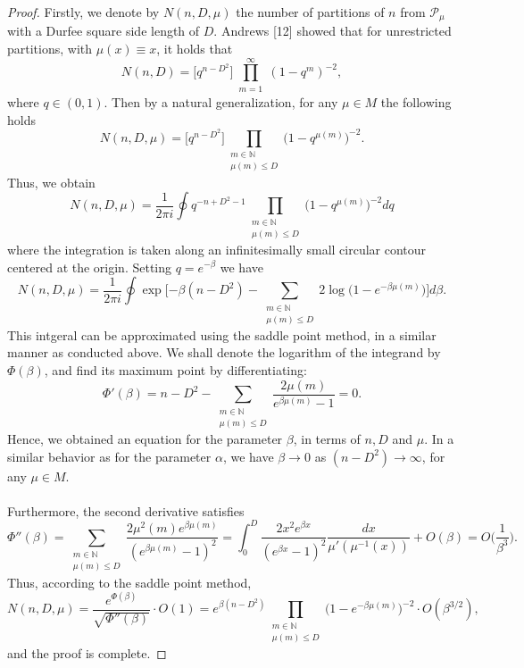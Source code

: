 \documentclass[10pt,a4paper]{amsart}
\begin{document}
\begin{proof}
    Firstly, we denote by $N(n,D,\mu)$ the number of partitions of $n$ from $\mathcal{P_{\mu}}$ with a Durfee square side length of $D$. Andrews [12] showed that for unrestricted partitions, with $\mu(x)\equiv x$, it holds that
    \begin{equation*}
        N(n,D)=\big[q^{n-D^2}\big]\prod_{\substack{m=1}}^\infty(1-q^{m})^{-2},
    \end{equation*}
    where $q\in(0,1)$. Then by a natural generalization, for any $\mu\in M$ the following holds
    \begin{equation}
        N(n,D,\mu)=\big[q^{n-D^2}\big]\prod_{\substack{m\in\mathbb{N} \\ \mu(m)\le D}}\big(1-q^{\mu(m)}\big)^{-2}.
    \end{equation}
    Thus, we obtain
    \begin{equation*}
        N(n,D,\mu)=\frac{1}{2\pi i}\oint q^{-n+D^2-1}\prod_{\substack{m\in\mathbb{N} \\ \mu(m)\le D}}\big(1-q^{\mu(m)}\big)^{-2}dq
    \end{equation*}
    where the integration is taken along an infinitesimally small circular contour centered at the origin. Setting $q=e^{-\beta}$ we have
    \begin{equation*}
        N(n,D,\mu)=\frac{1}{2\pi i}\oint \exp\bigg[{-\beta(n-D^2)-\sum_{\substack{m\in\mathbb{N} \\ \mu(m)\le D}} 2\log\big(1-e^{-\beta \mu(m)}\big)}\bigg]d\beta.
    \end{equation*}
    This intgeral can be approximated using the saddle point method, in a similar manner as conducted above. We shall denote the logarithm of the integrand by $\Phi(\beta)$, and find its maximum point by differentiating:
    \begin{equation*}
        \Phi'(\beta)=n-D^2-\sum_{\substack{m\in\mathbb{N} \\ \mu(m)\le D}}\frac{2\mu(m)}{e^{\beta\mu(m)}-1}=0.
    \end{equation*}
    Hence, we obtained an equation for the parameter $\beta$, in terms of $n, D$ and $\mu$. In a similar behavior as for the parameter $\alpha$, we have $\beta\to0$ as $(n-D^2)\to\infty$, for any $\mu\in M$. \\
    \\
    Furthermore, the second derivative satisfies
    \begin{equation}\label{second-der}
        \Phi''(\beta)=\sum_{\substack{m\in\mathbb{N} \\ \mu(m)\le D}}\frac{2\mu^2(m)e^{\beta\mu(m)}}{(e^{\beta\mu(m)}-1)^2}=\int_0^D\frac{2x^2e^{\beta x}}{(e^{\beta x} -1)^2}\frac{dx}{\mu'(\mu^{-1}(x))} + O(\beta)=O\Big(\frac{1}{\beta^3}\Big).
    \end{equation}
    Thus, according to the saddle point method,
\begin{equation*}
    N(n,D,\mu)=\frac{e^{\Phi(\beta)}}{\sqrt{\Phi''(\beta)}}\cdot O(1)=e^{\beta(n-D^2)}\prod_{\substack{m\in\mathbb{N} \\ \mu(m)\le D}}\big(1-e^{-\beta\mu(m)}\big)^{-2} \cdot O(\beta^{3/2}),
\end{equation*}
and the proof is complete.
\end{proof}
\end{document}

